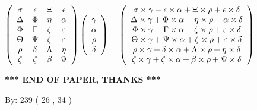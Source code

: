 \documentclass[12pt]{article}
\begin{document}
$  %
 \left( \begin{array}
 {
 c
 c
 c
 c
 }
 \sigma & 
 \epsilon & 
                    \Xi & 
 \epsilon \\ 
 \Delta & 
 \Phi & 
 \eta & 
 \alpha \\ 
 \Phi & 
 \Gamma & 
                    \zeta & 
 \varepsilon \\ 
 \Theta & 
 \Psi & 
                    \zeta & 
 \varepsilon \\ 
 \rho & 
 \delta & 
 \Lambda & 
 \eta \\ 
                    \zeta & 
                    \zeta & 
 \beta & 
 \Psi
 \end{array} \right)
 \left( \begin{array}
 {
 c
 }
 \gamma \\ 
 \alpha \\ 
 \rho \\ 
 \delta
 \end{array} \right)
=
 \left( \begin{array}
 {
 c
 }
  \sigma \times  \gamma +  \epsilon \times  \alpha +                     \Xi \times  \rho +  \epsilon \times  \delta \\ 
  \Delta \times  \gamma +  \Phi \times  \alpha +  \eta \times  \rho +  \alpha \times  \delta \\ 
  \Phi \times  \gamma +  \Gamma \times  \alpha +                     \zeta \times  \rho +  \varepsilon \times  \delta \\ 
  \Theta \times  \gamma +  \Psi \times  \alpha +                     \zeta \times  \rho +  \varepsilon \times  \delta \\ 
  \rho \times  \gamma +  \delta \times  \alpha +  \Lambda \times  \rho +  \eta \times  \delta \\ 
                     \zeta \times  \gamma +                     \zeta \times  \alpha +  \beta \times  \rho +  \Psi \times  \delta
 \end{array} \right)
$
 
   
   
   
   
\vspace{1.0in} 
{\textbf{\large{ *** END OF PAPER, THANKS *** }}} 
   
   
\hspace{1.0in} By: 
         239 (          26 ,           34 )
   
   
   
   
\newpage 
\setcounter{page}{ 
    29001 } 
   
\end{document}
